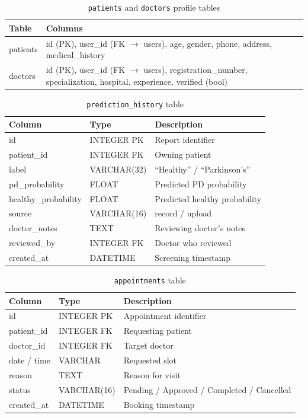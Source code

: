 \documentclass[oneside,a4paper,12pt]{report}
\begin{document}
\begin{table}[H]
\centering
\caption{\texttt{patients} and \texttt{doctors} profile tables}
\label{tab:tprofiles}
\def\arraystretch{1.2}
\begin{tabularx}{\textwidth}{|l|X|}
\hline
\textbf{Table} & \textbf{Columns} \\ \hline
patients & id (PK), user\_id (FK $\rightarrow$ users), age, gender, phone, address, medical\_history \\ \hline
doctors & id (PK), user\_id (FK $\rightarrow$ users), registration\_number, specialization, hospital, experience, verified (bool) \\ \hline
\end{tabularx}
\end{table}

\begin{table}[H]
\centering
\caption{\texttt{prediction\_history} table}
\label{tab:tpred}
\def\arraystretch{1.2}
\begin{tabularx}{\textwidth}{|l|l|X|}
\hline
\textbf{Column} & \textbf{Type} & \textbf{Description} \\ \hline
id & INTEGER PK & Report identifier \\ \hline
patient\_id & INTEGER FK & Owning patient \\ \hline
label & VARCHAR(32) & ``Healthy'' / ``Parkinson's'' \\ \hline
pd\_probability & FLOAT & Predicted PD probability \\ \hline
healthy\_probability & FLOAT & Predicted healthy probability \\ \hline
source & VARCHAR(16) & record / upload \\ \hline
doctor\_notes & TEXT & Reviewing doctor's notes \\ \hline
reviewed\_by & INTEGER FK & Doctor who reviewed \\ \hline
created\_at & DATETIME & Screening timestamp \\ \hline
\end{tabularx}
\end{table}

\begin{table}[H]
\centering
\caption{\texttt{appointments} table}
\label{tab:tappt}
\def\arraystretch{1.2}
\begin{tabularx}{\textwidth}{|l|l|X|}
\hline
\textbf{Column} & \textbf{Type} & \textbf{Description} \\ \hline
id & INTEGER PK & Appointment identifier \\ \hline
patient\_id & INTEGER FK & Requesting patient \\ \hline
doctor\_id & INTEGER FK & Target doctor \\ \hline
date / time & VARCHAR & Requested slot \\ \hline
reason & TEXT & Reason for visit \\ \hline
status & VARCHAR(16) & Pending / Approved / Completed / Cancelled \\ \hline
created\_at & DATETIME & Booking timestamp \\ \hline
\end{tabularx}
\end{table}
\end{document}
